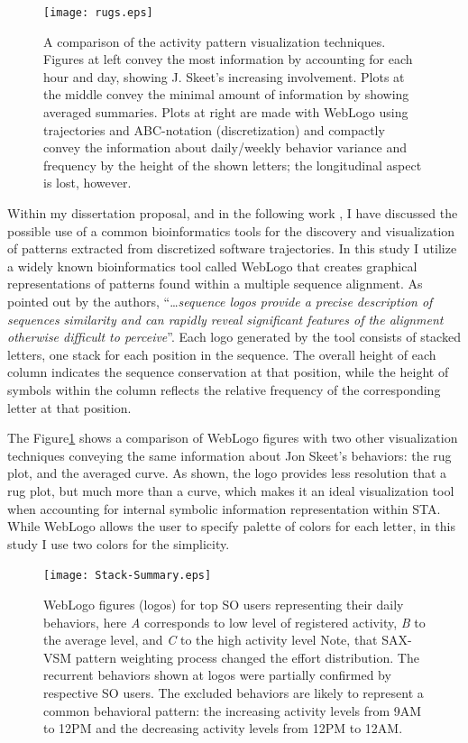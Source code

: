 \begin{figure}[t]
   \centering
   \texttt{[image: rugs.eps]}
   \caption{A comparison of the activity pattern visualization techniques. Figures at left convey the most information by accounting for each hour and day, showing J. Skeet's increasing involvement. Plots at the middle convey the minimal amount of information by showing averaged summaries. Plots at right are made with WebLogo using trajectories and ABC-notation (discretization) and compactly convey the information about daily/weekly behavior variance and frequency by the height of the shown letters; the longitudinal aspect is lost, however.}
   \label{fig:rugs}   
\end{figure}

Within my dissertation proposal, and in the following work \cite{csdl2-10-09}, I have discussed the possible use of a common bioinformatics tools for the discovery and visualization of patterns extracted from discretized software trajectories. In this study I utilize a widely known bioinformatics tool called WebLogo \cite{weblogo} that creates graphical representations of patterns found within a multiple sequence alignment. As pointed out by the authors, ``\dots \textit{sequence logos provide a precise description of sequences similarity and can rapidly reveal significant features of the alignment otherwise difficult to perceive}''. Each logo generated by the tool consists of stacked letters, one stack for each position in the sequence. The overall height of each column indicates the sequence conservation at that position, while the height of symbols within the column reflects the relative frequency of the corresponding letter at that position.

The Figure\ref{fig:rugs} shows a comparison of WebLogo figures with two other visualization techniques conveying the same information about Jon Skeet's behaviors: the rug plot, and the averaged curve. As shown, the logo provides less resolution that a rug plot, but much more than a curve, which makes it an ideal visualization tool when accounting for internal symbolic information representation within STA. While WebLogo allows the user to specify palette of colors for each letter, in this study I use two colors for the simplicity. 
\begin{figure}[t]
   \centering
   \texttt{[image: Stack-Summary.eps]}
   \caption{WebLogo figures (logos) for top SO users representing their daily behaviors, here \textit{A} corresponds to low level of registered activity, \textit{B} to the average level, and \textit{C} to the high activity level Note, that SAX-VSM pattern weighting process changed the effort distribution. The recurrent behaviors shown at logos were partially confirmed by respective SO users. The excluded behaviors are likely to represent a common behavioral pattern: the increasing activity levels from 9AM to 12PM and the decreasing activity levels from 12PM to 12AM.}
   \label{fig:stack_daily}   
\end{figure}

